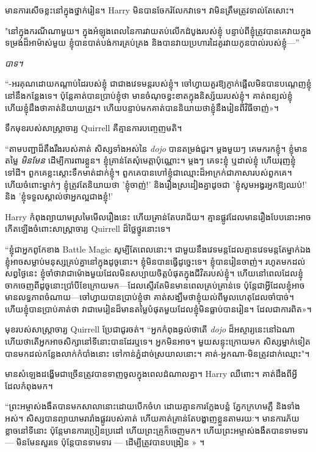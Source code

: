 {{{{មានការសើចខ្លះនៅក្នុងថ្នាក់រៀន។ Harry មិនបានចែករំលែកវាទេ។ វាមិនត្រឹមត្រូវទាល់តែសោះ។

"នៅក្នុងករណីណាមួយ។ ក្នុងអំឡុងពេលនៃការវាយតប់លើកដំបូងរបស់ខ្ញុំ បន្ទាប់ពីខ្ញុំត្រូវបានគេវាយក្នុងទម្រង់ដ៏អាម៉ាស់មួយ ខ្ញុំបានបាត់បង់ការគ្រប់គ្រង និងបានវាយប្រហារដៃគូរវាយកូនបាល់របស់ខ្ញុំ—”

\emph{បាទ។}

“-អរគុណដោយកណ្តាប់ដៃរបស់ខ្ញុំ ជាជាងវេទមន្តរបស់ខ្ញុំ។ ចៅហ្វាយគួរឱ្យភ្ញាក់ផ្អើលមិនបានបណ្តេញខ្ញុំនៅនឹងកន្លែងទេ។ ប៉ុន្តែ​គាត់​បាន​ប្រាប់​ខ្ញុំ​ថា មាន​ចំណុច​ខ្វះខាត​ក្នុង​និស្ស័យ​របស់​ខ្ញុំ។ គាត់ពន្យល់ខ្ញុំ ហើយខ្ញុំដឹងថាគាត់និយាយត្រូវ។ ហើយ​បន្ទាប់​មក​គាត់​បាន​និយាយ​ថា​ខ្ញុំ​នឹង​រៀន​ពី​វិធី​ចាញ់»។

ទឹកមុខរបស់សាស្រ្តាចារ្យ Quirrell គឺគ្មានការបញ្ចេញមតិ។

“តាមបញ្ជាដ៏តឹងរឹងរបស់គាត់ សិស្សទាំងអស់នៃ \emph{dojo} បានតម្រង់ជួរ។ ម្តងមួយៗ គេមករកខ្ញុំ។ ខ្ញុំមានតម្លៃ \emph{មិនមែន} ដើម្បីការពារខ្លួន។ ខ្ញុំគ្រាន់តែសុំមេត្តាប៉ុណ្ណោះ។ ម្តងៗ គេទះខ្ញុំ ឬដាល់ខ្ញុំ ហើយរុញខ្ញុំទៅដី។ ពួកគេខ្លះស្ដោះទឹកមាត់ដាក់ខ្ញុំ។ ពួកគេបានហៅខ្ញុំជាឈ្មោះដ៏អាក្រក់ជាភាសារបស់ពួកគេ។ ហើយចំពោះម្នាក់ៗ ខ្ញុំត្រូវតែនិយាយថា 'ខ្ញុំចាញ់!' និងរឿងស្រដៀងគ្នាដូចជា 'ខ្ញុំសូមអង្វរអ្នកឱ្យឈប់!' និង 'ខ្ញុំទទួលស្គាល់ថាអ្នកល្អជាងខ្ញុំ!'

Harry កំពុងព្យាយាមស្រមៃមើលរឿងនេះ ហើយគ្រាន់តែបរាជ័យ។ គ្មាន​ផ្លូវ​ដែល​មាន​រឿង​បែប​នោះ​អាច​កើត​ឡើង​ចំពោះ​សាស្ត្រាចារ្យ Quirrell ដ៏​ថ្លៃថ្នូរ​នោះ​ទេ។

“ខ្ញុំ​ជា​អ្នក​ពូកែ​ខាង Battle Magic សូម្បី​តែ​ពេល​នោះ។ ជាមួយនឹងវេទមន្តដែលគ្មានវេទមន្តតែម្នាក់ឯង ខ្ញុំអាចសម្លាប់មនុស្សគ្រប់គ្នានៅក្នុងដូចូនោះ។ ខ្ញុំ​មិន​បាន​ធ្វើ​ដូច្នេះ​ទេ។ ខ្ញុំបានរៀនចាញ់។ រហូត​មក​ដល់​សព្វ​ថ្ងៃ​នេះ ខ្ញុំ​ចាំ​ថា​វា​ជា​ម៉ោង​មួយ​ដែល​មិន​សប្បាយ​ចិត្ត​បំផុត​ក្នុង​ជីវិត​របស់​ខ្ញុំ។ ហើយនៅពេលដែលខ្ញុំចាកចេញពីដូចូនោះប្រាំបីខែក្រោយមក—ដែលស្ទើរតែមិនមានពេលគ្រប់គ្រាន់ទេ ប៉ុន្តែជាអ្វីដែលខ្ញុំអាចមានលទ្ធភាពចំណាយ—ចៅហ្វាយបានប្រាប់ខ្ញុំថា គាត់សង្ឃឹមថាខ្ញុំយល់ពីមូលហេតុដែលចាំបាច់។ ហើយ​ខ្ញុំ​បាន​ប្រាប់​គាត់​ថា វា​ជា​មេរៀន​ដ៏​មាន​តម្លៃ​បំផុត​មួយ​ដែល​ខ្ញុំ​មិន​ធ្លាប់​បាន​រៀន។ ដែល​ជា​ការ​ពិត»។

មុខរបស់សាស្រ្តាចារ្យ Quirrell ប្រែជាជូរចត់។ “អ្នកកំពុងឆ្ងល់ថាតើ \emph{dojo} ដ៏អស្ចារ្យនេះនៅឯណា ហើយថាតើអ្នកអាចសិក្សានៅទីនោះបានដែរឬទេ។ អ្នកមិនអាច។ មួយសន្ទុះក្រោយមក សិស្សម្នាក់ទៀតបានមកដល់កន្លែងលាក់កំបាំងនោះ ទៅកាន់ភ្នំដាច់ស្រយាលនោះ។ គាត់-អ្នកណា-មិនត្រូវដាក់ឈ្មោះ"។

មាន​សំឡេង​ដង្ហើម​ជា​ច្រើន​ត្រូវ​បាន​ទាញ​ចូល​ក្នុង​ពេល​ដំណាល​គ្នា។ Harry ឈឺពោះ។ គាត់ដឹងពីអ្វីដែលកំពុងមក។

“ព្រះអម្ចាស់ងងឹតបានមកសាលានោះដោយបើកចំហ ដោយគ្មានការក្លែងបន្លំ ភ្នែកក្រហមភ្លឺ និងទាំងអស់។ សិស្សបានព្យាយាមរារាំងផ្លូវរបស់គាត់ ហើយគាត់គ្រាន់តែបង្ហាញខ្លួនតាមរយៈ។ មាន​ការ​ភ័យ​ខ្លាច​នៅ​ទី​នោះ ប៉ុន្តែ​មាន​ការ​ប្រៀនប្រដៅ ហើយ​ព្រះ​គ្រូ​ក៏​ចេញ​មក។ ហើយ​ព្រះអម្ចាស់​ងងឹត​បាន​ទាមទារ — មិន​មែន​សួរ​ទេ ប៉ុន្តែ​បាន​ទាមទារ — ដើម្បី​ត្រូវ​បាន​បង្រៀន » ។

}}}}
